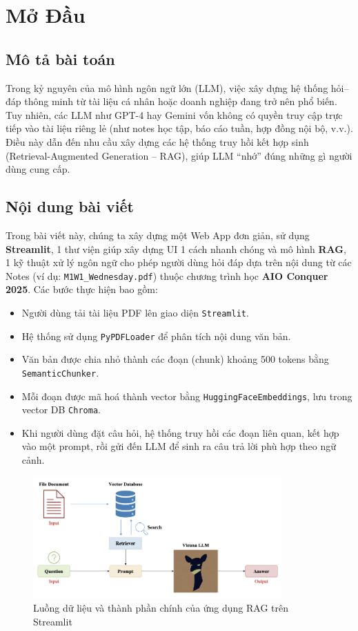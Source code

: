 \documentclass[11pt]{article}
\begin{document}
\section{Mở Đầu}
\subsection{Mô tả bài toán}
Trong kỷ nguyên của mô hình ngôn ngữ lớn (LLM), việc xây dựng hệ thống hỏi–đáp thông minh từ tài liệu cá nhân hoặc doanh nghiệp đang trở nên phổ biến. Tuy nhiên, các LLM như GPT-4 hay Gemini vốn không có quyền truy cập trực tiếp vào tài liệu riêng lẻ (như notes học tập, báo cáo tuần, hợp đồng nội bộ, v.v.). Điều này dẫn đến nhu cầu xây dựng các hệ thống truy hồi kết hợp sinh (Retrieval-Augmented Generation – RAG), giúp LLM “nhớ” đúng những gì người dùng cung cấp.


\subsection{Nội dung bài viết}
Trong bài viết này, chúng ta xây dựng một Web App đơn giản, sử dụng \textbf{Streamlit}, 1 thư viện giúp xây dựng UI 1 cách nhanh chóng và mô hình \textbf{RAG}, 1 kỹ thuật xử lý ngôn ngữ cho phép người dùng hỏi đáp dựa trên nội dung từ các Notes (ví dụ: \texttt{M1W1\_Wednesday.pdf}) thuộc chương trình học \textbf{AIO Conquer 2025}. Các bước thực hiện bao gồm:
\begin{itemize}
    \item Người dùng tải tài liệu PDF lên giao diện \texttt{Streamlit}.
    \item Hệ thống sử dụng \texttt{PyPDFLoader} để phân tích nội dung văn bản.
    \item Văn bản được chia nhỏ thành các đoạn (chunk) khoảng 500 tokens bằng \texttt{SemanticChunker}.
    \item Mỗi đoạn được mã hoá thành vector bằng \texttt{HuggingFaceEmbeddings}, lưu trong vector DB \texttt{Chroma}.
    \item Khi người dùng đặt câu hỏi, hệ thống truy hồi các đoạn liên quan, kết hợp vào một prompt, rồi gửi đến LLM để sinh ra câu trả lời phù hợp theo ngữ cảnh.
\end{itemize}

\begin{figure}[H]
    \centering
    \includegraphics[width=0.85\textwidth]{architecture.png}
    \caption{Luồng dữ liệu và thành phần chính của ứng dụng RAG trên Streamlit}
\end{figure}
\end{document}

